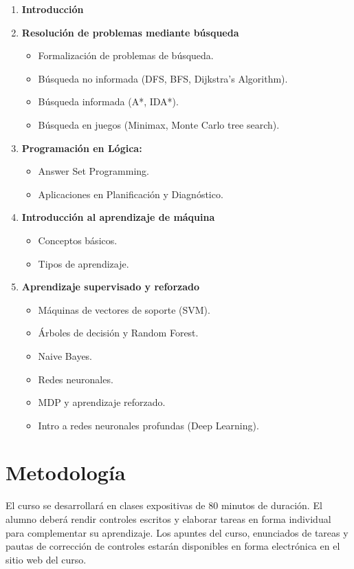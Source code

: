 \documentclass[11pt,letterpaper]{article}
\begin{document}
\begin{enumerate}
  \item \textbf{Introducción}    
  \item \textbf{Resolución de problemas mediante búsqueda}
    \begin{itemize}
    \item Formalización de problemas de búsqueda.
    \item Búsqueda no informada (DFS, BFS, Dijkstra's Algorithm).
    \item Búsqueda informada (A*, IDA*).
    \item Búsqueda en juegos (Minimax, Monte Carlo tree search).
    \end{itemize}
  \item \textbf{Programación en Lógica:}
    \begin{itemize}
      \item Answer Set Programming.
      \item Aplicaciones en Planificación y Diagnóstico.            
    \end{itemize}
  \item \textbf{Introducción al aprendizaje de máquina}
    \begin{itemize}    
      \item Conceptos básicos.
      \item Tipos de aprendizaje.      
    \end{itemize}
  \item \textbf{Aprendizaje supervisado y reforzado}
    \begin{itemize}                  
      \item Máquinas de vectores de soporte (SVM).
      \item Árboles de decisión y Random Forest.
      \item Naive Bayes.
      \item Redes neuronales.
      \item MDP y aprendizaje reforzado.
      \item Intro a redes neuronales profundas (Deep Learning).
    \end{itemize}              
\end{enumerate}

\section{Metodología}
El curso se desarrollará en clases expositivas de 80 minutos de duración. El
alumno deberá rendir controles escritos y elaborar tareas en forma individual
para complementar su aprendizaje. Los apuntes del curso, enunciados de tareas y
pautas de corrección de controles estarán disponibles en forma electrónica en el
sitio web del curso.
\end{document}
